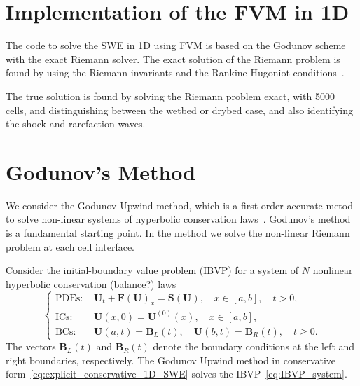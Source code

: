 \section{Implementation of the FVM in 1D}
The code to solve the SWE in 1D using FVM is based on the Godunov scheme with the exact Riemann solver.
The exact solution of the Riemann problem is found by using the Riemann invariants and the Rankine-Hugoniot conditions~\cite{trento_course}.

The true solution is found by solving the Riemann problem exact, with 5000 cells, and distinguishing between the wetbed or drybed case, and also identifying the shock and rarefaction waves.


\section{Godunov's Method}
We consider the Godunov Upwind method, which is a first-order accurate metod to solve non-linear systems of hyperbolic conservation laws~\cite{Toro2024}.
Godunov's method is a fundamental starting point.
In the method we solve the non-linear Riemann problem at each cell interface. 

Consider the initial-boundary value problem (IBVP) for a system of $N$ nonlinear hyperbolic conservation (balance?) laws     
\begin{equation}\label{eq:IBVP_system}
    \begin{cases}
    \text{PDEs: }    &\mathbf{U}_t + \mathbf{F(U)}_x = \mathbf{S(U)}, \quad x \in [a, b], \quad t > 0, \\
    \text{ICs: }    &\mathbf{U}(x,0) = \mathbf{U}^{(0)}(x), \quad x \in [a,b], \\
    \text{BCs: }    &\mathbf{U}(a,t) = \mathbf{B}_{L}(t), \quad \mathbf{U}(b,t) = \mathbf{B}_{R}(t), \quad t \geq 0.
    \end{cases}
\end{equation}
The vectors $\mathbf{B}_L (t)$ and $\mathbf{B}_R (t)$ denote the boundary conditions at the left and right boundaries, respectively.
The Godunov Upwind method in conservative form~\eqref{eq:explicit_conservative_1D_SWE} solves the IBVP~\eqref{eq:IBVP_system}.


